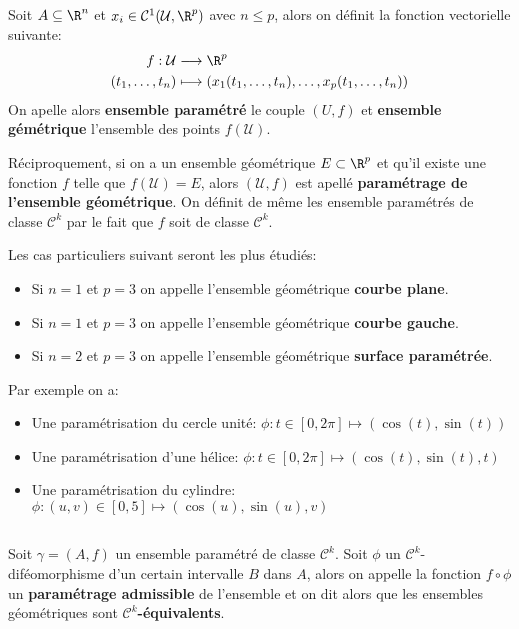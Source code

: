 \subsection*{}
Soit \(A \subseteq \R^n\) et \(x_i \in \mathcal{C}^1(\mathcal{U}, \R^p)\) avec \(n \leq p\), alors on définit la fonction vectorielle suivante:
\[
   \begin{aligned}
      f: \mathcal{U} &\longrightarrow \R^p\\
      (t_1, \ldots, t_n) &\longmapsto (x_1(t_1, \ldots, t_n), \ldots, x_p(t_1, \ldots, t_n))
   \end{aligned}
\]
On apelle alors \textbf{ensemble paramétré} le couple \((U, f)\) et \textbf{ensemble gémétrique} l'ensemble des points \(f(\mathcal{U})\).\<

Réciproquement, si on a un ensemble géométrique \(E \subset \R^p\) et qu'il existe une fonction \(f\) telle que \(f(\mathcal{U}) = E\), alors \((\mathcal{U}, f)\) est apellé \textbf{paramétrage de l'ensemble géométrique}. On définit de même les ensemble paramétrés de classe \(\mathcal{C}^k\) par le fait que \(f\) soit de classe \(\mathcal{C}^k\). \<

Les cas particuliers suivant seront les plus étudiés:
\begin{itemize}
   \item Si \(n = 1\) et \(p = 3\) on appelle l'ensemble géométrique \textbf{courbe plane}.
   \item Si \(n = 1\) et \(p = 3\) on appelle l'ensemble géométrique \textbf{courbe gauche}.
   \item Si \(n = 2\) et \(p = 3\) on appelle l'ensemble géométrique \textbf{surface paramétrée}.
\end{itemize}
Par exemple on a:
\begin{itemize}
   \item Une paramétrisation du cercle unité: \(\phi: t \in [0, 2\pi] \longmapsto (\cos(t), \sin(t))\)
   \item Une paramétrisation d'une hélice: \(\phi: t \in [0, 2\pi] \longmapsto (\cos(t), \sin(t), t)\)
   \item Une paramétrisation du cylindre: \(\phi: (u, v) \in [0, 5] \longmapsto (\cos(u), \sin(u), v)\)
\end{itemize}

\subsection*{}
Soit \(\gamma = (A, f)\) un ensemble paramétré de classe \(\mathcal{C}^k\). Soit \(\phi\) un \(\mathcal{C}^k\)-diféomorphisme d'un certain intervalle \(B\) dans \(A\), alors on appelle la fonction \(f \circ \phi\) un \textbf{paramétrage admissible} de l'ensemble et on dit alors que les ensembles géométriques sont \(\mathcal{C}^k\)\textbf{-équivalents}.\<

